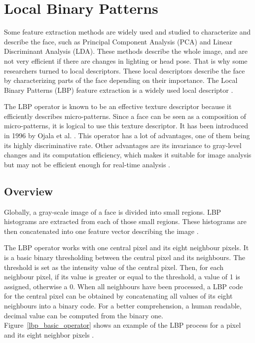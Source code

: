 \chapter{Local Binary Patterns}
\label{chap:lbp}

\noindent Some feature extraction methods are widely used and studied to characterize and describe the face, such as Principal Component Analysis (PCA) and Linear Discriminant Analysis (LDA). These methods describe the whole image, and are not very efficient if there are changes in lighting or head pose. That is why some researchers turned to local descriptors. These local descriptors describe the face by characterizing parts of the face depending on their importance. The Local Binary Patterns (LBP) feature extraction is a widely used local descriptor \cite{AHO06}.
\newline

\noindent The LBP operator is known to be an effective texture descriptor because it efficiently describes micro-patterns. Since a face can be seen as a composition of micro-patterns, it is logical to use this texture descriptor. It has been introduced in 1996 by Ojala et al. \cite{OJA96}. This operator has a lot of advantages, one of them being its highly discriminative rate. Other advantages are its invariance to gray-level changes and its computation efficiency, which makes it suitable for image analysis but may not be efficient enough for real-time analysis \cite{AHO06}.
\newline

\section{Overview}

\vspace{\baselineskip}
\noindent Globally, a gray-scale image of a face is divided into small regions. LBP histograms are extracted from each of those small regions. These histograms are then concatenated into one feature vector describing the image \cite{JUL07}.
\newline

\noindent The LBP operator works with one central pixel and its eight neighbour pixels. It is a basic binary thresholding between the central pixel and its neighbours. The threshold is set as the intensity value of the central pixel. Then, for each neighbour pixel, if its value is greater or equal to the threshold, a value of 1 is assigned, otherwise a 0. When all neighbours have been processed, a LBP code for the central pixel can be obtained by concatenating all values of its eight neighbours into a binary code. For a better comprehension, a human readable, decimal value can be computed from the binary one. Figure~\ref{lbp_basic_operator} shows an example of the LBP process for a pixel and its eight neighbor pixels \cite{JUL07}.
\newline

